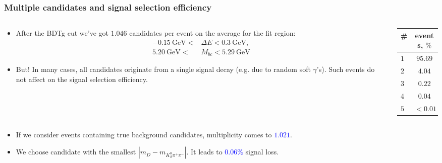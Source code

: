 \documentclass[10 pt,compress,mathserif]{beamer}
\begin{document}
\begin{frame}
\frametitle{Multiple candidates and signal selection efficiency} 
\begin{small}
\begin{columns}
 \begin{column}{0.78\textwidth}
 \begin{itemize}
  \item After the BDTg cut we've got $1.046$ candidates per event on the average for the fit region:
  \begin{equation*}
  \begin{split}
   -0.15\ \text{GeV} < &\Delta E < 0.3\ \text{GeV},\\
    5.20\ \text{GeV} < &M_{bc} < 5.29\ \text{GeV}
  \end{split}
  \end{equation*}

  \item But! In many cases, all candidates originate from a single signal decay (e.g. due to random soft $\gamma$'s). Such events do not affect on the signal selection efficiency.
 \end{itemize}
 \end{column}
 \begin{column}{0.22\textwidth}
  \small
   \begin{tabular}{|l|c|} \hline
   \# & events, $\%$ \\ \hline
   $1$ & $95.69$\\ \hline
   $2$ & $4.04$\\ \hline
   $3$ & $0.22$\\ \hline
   $4$ & $0.04$\\ \hline
   $5$ & $<0.01$\\ \hline
   \end{tabular}
  \end{column}
 \end{columns}

 \begin{columns}
  \begin{column}{0.4\textwidth}
   \begin{itemize}
    \item If we consider events containing true background candidates, multiplicity comes to \textcolor{blue}{$1.021$}.
    \item We choose candidate with the smallest $|m_{D}-m_{K_S^0\pi^+\pi^-}|$. It leads to \textcolor{blue}{$0.06\%$} signal loss.
   \end{itemize}


\end{column}
\end{columns}
\end{small}
\end{frame}
\end{document}
